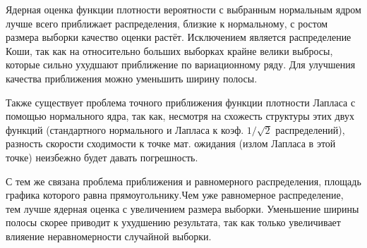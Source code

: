 \documentclass[a4]{article}
\begin{document}
\par Ядерная оценка функции плотности вероятности с выбранным нормальным ядром лучше всего приближает распределения, близкие к нормальному, с ростом размера выборки качество оценки растёт. Исключением является распределение Коши, так как на относительно больших выборках крайне велики выбросы, которые сильно ухудшают приближение по вариационному ряду. Для улучшения качества приближения можно уменьшить ширину полосы.
\par Также существует проблема точного приближения функции плотности Лапласа с помощью нормального ядра, так как, несмотря на схожесть структуры этих двух функций (стандартного нормального и Лапласа к коэф. $ 1/\sqrt{2} $ распределений), разность скорости сходимости к точке мат. ожидания (излом Лапласа в этой точке) неизбежно будет давать погрешность. 
\par С тем же связана проблема приближения и равномерного распределения, площадь графика которого равна прямоугольнику.Чем уже равномерное распределение, тем лучше ядерная оценка с увеличением размера выборки. Уменьшение ширины полосы скорее приводит к ухудшению результата, так как только увеличивает влияение неравномерности случайной выборки.
\end{document}

